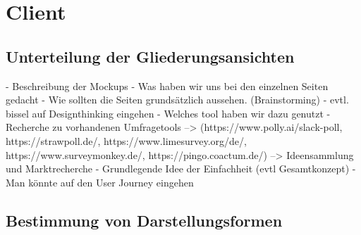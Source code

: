 \section{Client}

\subsection{Unterteilung der Gliederungsansichten}

	- Beschreibung der Mockups
		- Was haben wir uns bei den einzelnen Seiten gedacht
		- Wie sollten die Seiten grundsätzlich aussehen. (Brainstorming)
		- evtl. bissel auf Designthinking eingehen
		- Welches tool haben wir dazu genutzt
	- Recherche zu vorhandenen Umfragetools --> (https://www.polly.ai/slack-poll, https://strawpoll.de/, https://www.limesurvey.org/de/, https://www.surveymonkey.de/, https://pingo.coactum.de/)
		--> Ideensammlung und Marktrecherche
	- Grundlegende Idee der Einfachheit (evtl Gesamtkonzept)
	- Man könnte auf den User Journey eingehen

\subsection{Bestimmung von Darstellungsformen}